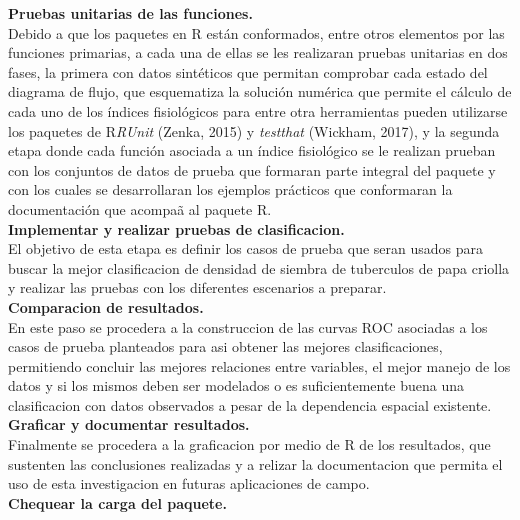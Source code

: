 \noindent
\textbf{Pruebas unitarias de las funciones.}\\

Debido a que los paquetes en R est\'an conformados, entre otros elementos por las funciones primarias, a cada una de ellas se les realizaran pruebas unitarias en dos fases, la primera con datos sint\'eticos que permitan comprobar cada estado del diagrama de flujo, que esquematiza la soluci\'on num\'erica que permite el c\'alculo de cada uno de los \'indices fisiol\'ogicos para entre otra herramientas pueden utilizarse los paquetes de R\emph{RUnit} (Zenka, 2015) y \emph{testthat} (Wickham, 2017), y la segunda etapa donde cada funci\'on asociada a un \'indice fisiol\'ogico se le realizan prueban con los conjuntos de datos de prueba que formaran parte integral del paquete y con los cuales se desarrollaran los ejemplos pr\'acticos que conformaran la documentaci\'on que acompa\~a al paquete R.\\

\noindent
\textbf{Implementar y realizar pruebas de clasificacion.}\\

El objetivo de esta etapa es definir los casos de prueba que seran usados para buscar la mejor clasificacion de densidad de siembra de tuberculos de papa criolla y realizar las pruebas con los diferentes escenarios a preparar.\\

\noindent
\textbf{Comparacion de resultados.}\\

En este paso se procedera a la construccion de las curvas ROC asociadas a los casos de prueba planteados para asi obtener las mejores clasificaciones, permitiendo concluir las mejores relaciones entre variables, el mejor manejo de los datos y si los mismos deben ser modelados o es suficientemente buena una clasificacion con datos observados a pesar de la dependencia espacial existente.\\

\noindent
\textbf{Graficar y documentar resultados.}\\

Finalmente se procedera a la graficacion por medio de R de los resultados, que sustenten las conclusiones realizadas y a relizar la documentacion que permita el uso de esta investigacion en futuras aplicaciones de campo.\\  
  
\noindent
\textbf{Chequear la carga del paquete.}\\

